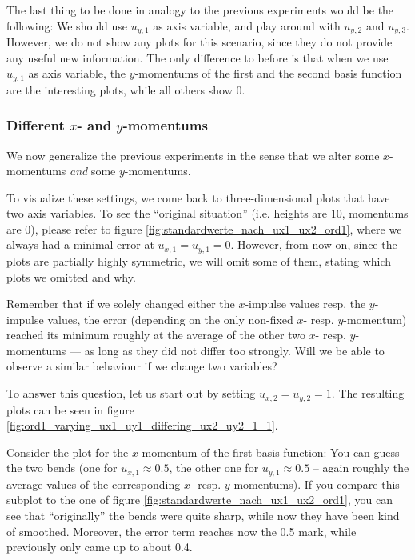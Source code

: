 \documentclass{article}
\begin{document}
The last thing to be done in analogy to the previous experiments would be the following: We should use $u_{y,1}$ as axis variable, and play around with $u_{y,2}$ and $u_{y,3}$. However, we do not show any plots for this scenario, since they do not provide any useful new information. The only difference to before is that when we use $u_{y,1}$ as axis variable, the $y$-momentums of the first and the second basis function are the interesting plots, while all others show 0.

\subsubsection{Different $x$- and $y$-momentums}
\label{sec:stiffness-analysis-different-ux-uy-momentums}

We now generalize the previous experiments in the sense that we alter some $x$-momentums \emph{and} some $y$-momentums.

To visualize these settings, we come back to three-dimensional plots that have two axis variables. To see the ``original situation'' (i.e. heights are 10, momentums are 0), please refer to figure \ref{fig:standardwerte_nach_ux1_ux2_ord1}, where we always had a minimal error at $u_{x,1}=u_{y,1}=0$. However, from now on, since the plots are partially highly symmetric, we will omit some of them, stating which plots we omitted and why.

Remember that if we solely changed either the $x$-impulse values resp. the $y$-impulse values, the error (depending on the only non-fixed $x$- resp. $y$-momentum) reached its minimum roughly at the average of the other two $x$- resp. $y$-momentums --- as long as they did not differ too strongly. Will we be able to observe a similar behaviour if we change two variables? 

To answer this question, let us start out by setting $u_{x,2}=u_{y,2}=1$. The resulting plots can be seen in figure \ref{fig:ord1_varying_ux1_uy1_differing_ux2_uy2_1_1}.



Consider the plot for the $x$-momentum of the first basis function: You can guess the two bends (one for $u_{x,1}\approx 0.5$, the other one for $u_{y,1}\approx 0.5$ -- again roughly the average values of the corresponding $x$- resp. $y$-momentums). If you compare this subplot to the one of figure \ref{fig:standardwerte_nach_ux1_ux2_ord1}, you can see that ``originally'' the bends were quite sharp, while now they have been kind of smoothed. Moreover, the error term reaches now the 0.5 mark, while previously only came up to about 0.4.
\end{document}
